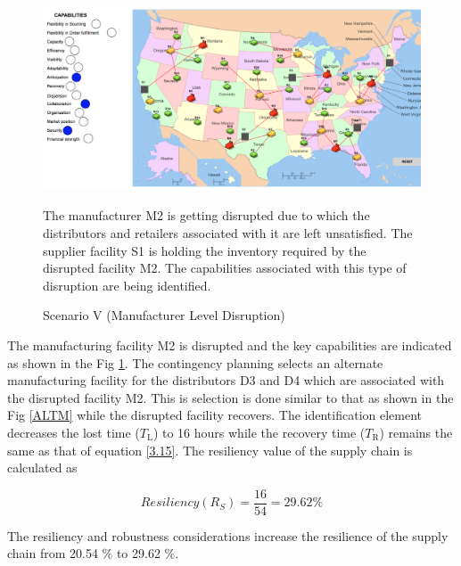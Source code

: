 \begin{figure}[H]
  \centering
  \includegraphics[width=6.5in]{figures/pdf/S5MLD.png}\\
  \caption{Scenario V (Manufacturer Level Disruption)}
  {The manufacturer M2 is getting disrupted due to which the  distributors and retailers associated with it are left unsatisfied. The supplier facility S1 is holding the inventory required by the disrupted facility M2. The capabilities associated with this type of disruption are being identified.}
  \label{S5ML}
\end{figure}   

The manufacturing facility M2 is disrupted and the key capabilities are indicated as shown in the Fig \ref{S5ML}. The contingency planning selects an alternate manufacturing facility for the distributors D3 and D4 which are associated with the disrupted facility M2. This is selection is done similar to that as shown in the Fig \ref{ALTM} while the disrupted facility recovers. The identification element decreases the lost time ($T_{\text{L}}$) to 16 hours while the recovery time ($T_{\text{R}}$) remains the same as that of equation \ref{3.15}. The resiliency value of the supply chain is calculated as

\begin{equation}
    Resiliency(R_S) = \frac{16}{54} = 29.62 \% \label{3.30}
\end{equation}

The resiliency and robustness considerations increase the resilience of the supply chain from 20.54 \% to 29.62 \%.

